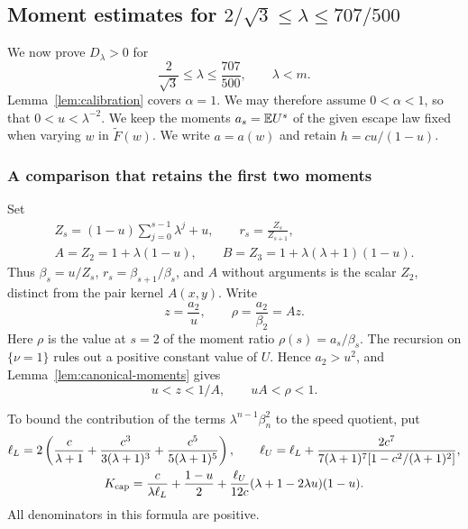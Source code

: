 \subsection{Moment estimates for \texorpdfstring{$2/\sqrt3\le\lambda\le707/500$}{2/sqrt(3) <= lambda <= 707/500}}\label{sec:near-region}
We now prove $D_\lambda>0$ for
\begin{equation}\label{eq:near-domain}
 \frac2{\sqrt3}\le\lambda\le\frac{707}{500},\qquad \lambda<m.
\end{equation}
Lemma~\ref{lem:calibration} covers $\alpha=1$. We may therefore assume $0<\alpha<1$, so that $0<u<\lambda^{-2}$. We keep the moments $a_s=\mathbb E U^s$ of the given escape law fixed when varying $w$ in $\widetilde F(w)$. We write $a=a(w)$ and retain $h=cu/(1-u)$.

\subsubsection{A comparison that retains the first two moments}
Set
\begin{equation}\label{eq:near-profile-defs}
 \begin{gathered}
 Z_s=(1-u)\sum_{j=0}^{s-1}\lambda^j+u,\qquad r_s=\frac{Z_s}{Z_{s+1}},\\
 A=Z_2=1+\lambda(1-u),\qquad B=Z_3=1+\lambda(\lambda+1)(1-u).
 \end{gathered}
\end{equation}
Thus $\beta_s=u/Z_s$, $r_s=\beta_{s+1}/\beta_s$, and $A$ without arguments is the scalar $Z_2$, distinct from the pair kernel $A(x,y)$. Write
\[
 z=\frac{a_2}{u},\qquad \rho=\frac{a_2}{\beta_2}=Az.
\]
Here $\rho$ is the value at $s=2$ of the moment ratio $\rho(s)=a_s/\beta_s$. The recursion on $\{\nu=1\}$ rules out a positive constant value of $U$. Hence $a_2>u^2$, and Lemma~\ref{lem:canonical-moments} gives
\begin{equation}\label{eq:near-moment-domain}
 u<z<1/A,\qquad uA<\rho<1.
\end{equation}

To bound the contribution of the terms $\lambda^{n-1}\beta_n^2$ to the speed quotient, put
\begin{equation}\label{eq:near-cap}
 \begin{gathered}
 \ell_L=2\left(\frac c{\lambda+1}+\frac{c^3}{3(\lambda+1)^3}
                   +\frac{c^5}{5(\lambda+1)^5}\right),\qquad
 \ell_U=\ell_L+\frac{2c^7}{7(\lambda+1)^7[1-c^2/(\lambda+1)^2]},\\
 K_{\rm cap}=\frac c{\lambda\ell_L}+\frac{1-u}{2}
 +\frac{\ell_U}{12c}(\lambda+1-2\lambda u)(1-u).
 \end{gathered}
\end{equation}
All denominators in this formula are positive.

